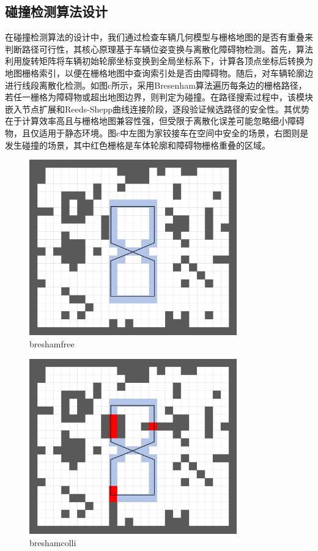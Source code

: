 \documentclass[master,academic]{ysuthesis} %
\begin{document}
		\subsection{碰撞检测算法设计}
		在碰撞检测算法的设计中，我们通过检查车辆几何模型与栅格地图的是否有重叠来判断路径可行性，其核心原理基于车辆位姿变换与离散化障碍物检测。首先，算法利用旋转矩阵将车辆初始轮廓坐标变换到全局坐标系下，计算各顶点坐标后转换为地图栅格索引，以便在栅格地图中查询索引处是否由障碍物。随后，对车辆轮廓边进行线段离散化检测。如图c所示，采用Bresenham算法遍历每条边的栅格路径，若任一栅格为障碍物或超出地图边界，则判定为碰撞。在路径搜索过程中，该模块嵌入节点扩展和Reeds-Shepp曲线连接阶段，逐段验证候选路径的安全性。其优势在于计算效率高且与栅格地图兼容性强，但受限于离散化误差可能忽略细小障碍物，且仅适用于静态环境。图c中左图为家铰接车在空间中安全的场景，右图则是发生碰撞的场景，其中红色栅格是车体轮廓和障碍物栅格重叠的区域。
		\begin{figure}[!ht]
			\centering
			\includegraphics[width=0.8\textwidth]{bresham_free.png}
			\caption{breshamfree}
			\label{fig:bresham_free}
		\end{figure}
		
		\begin{figure}[!ht]
			\centering
			\includegraphics[width=0.8\textwidth]{bresham_colli.png}
			\caption{breshamcolli}
			\label{fig:bresham_colli}
		\end{figure}
\end{document}
